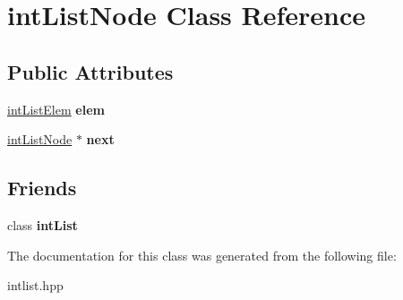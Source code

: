 \hypertarget{classintListNode}{\section{int\-List\-Node \-Class \-Reference}
\label{classintListNode}
}
\subsection*{\-Public \-Attributes}
\begin{DoxyCompactItemize}
\item 
\hypertarget{classintListNode_aec7fa705072ca9a1656ee69fd8ca5b42}{\hyperlink{structintListElem}{int\-List\-Elem} {\bfseries elem}}\label{classintListNode_aec7fa705072ca9a1656ee69fd8ca5b42}

\item 
\hypertarget{classintListNode_ae9e0cb08795072c7dcbe74e966f5d5a3}{\hyperlink{classintListNode}{int\-List\-Node} $\ast$ {\bfseries next}}\label{classintListNode_ae9e0cb08795072c7dcbe74e966f5d5a3}

\end{DoxyCompactItemize}
\subsection*{\-Friends}
\begin{DoxyCompactItemize}
\item 
\hypertarget{classintListNode_a9ff8b544afaa03dc4a3307780ec03cf3}{class {\bfseries int\-List}}\label{classintListNode_a9ff8b544afaa03dc4a3307780ec03cf3}

\end{DoxyCompactItemize}


\-The documentation for this class was generated from the following file\-:\begin{DoxyCompactItemize}
\item 
intlist.\-hpp\end{DoxyCompactItemize}

